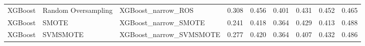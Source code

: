 \begin{tabular}{lllllllll}
                     XGBoost & Random Oversampling &                           XGBoost\_narrow\_ROS & 0.308 &                     0.456 &                 0.401 &                  0.431 &                                   0.452 &     0.465 \\
                     XGBoost &               SMOTE &                         XGBoost\_narrow\_SMOTE & 0.241 &                     0.418 &                 0.364 &                  0.429 &                                   0.413 &     0.488 \\
                     XGBoost &            SVMSMOTE &                      XGBoost\_narrow\_SVMSMOTE & 0.277 &                     0.420 &                 0.364 &                  0.407 &                                   0.432 &     0.486 \\
\bottomrule
\end{tabular}
